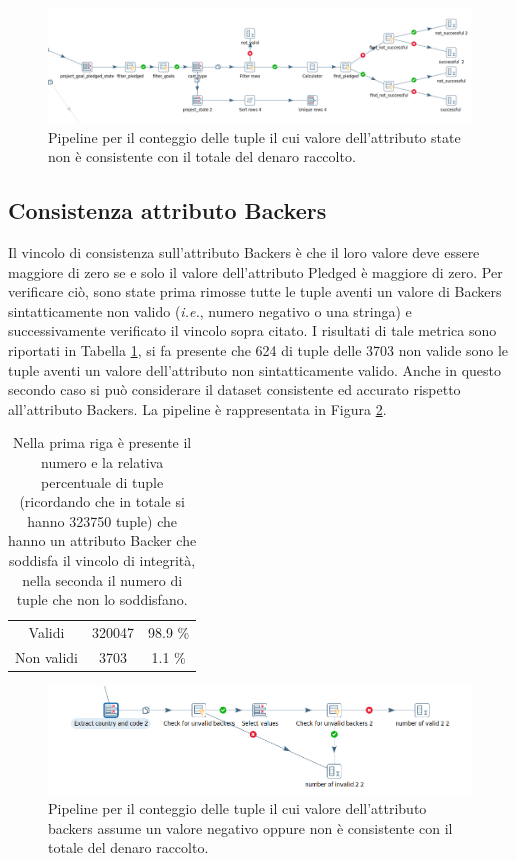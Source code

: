 \begin{figure}[h!]
	\centering
	\includegraphics[width=0.7\linewidth]{images/DQ_stateaconsistency}
	\caption{Pipeline per il conteggio delle tuple il cui valore dell'attributo state non è consistente con il totale del denaro raccolto.}
	\label{fig:dqstateaconsistency}
\end{figure}


\subsection{Consistenza attributo Backers}
Il vincolo di consistenza sull'attributo Backers è che il loro valore deve essere maggiore di zero se e solo il valore dell'attributo Pledged è maggiore di zero.
Per verificare ciò, sono state prima rimosse tutte le tuple aventi un valore di Backers sintatticamente non valido (\textit{i.e.}, numero negativo o una stringa) e successivamente verificato il vincolo sopra citato.
I risultati di tale metrica sono riportati in Tabella \ref{tab:con_backers}, si fa presente che 624 di tuple delle 3703 non valide sono le tuple aventi un valore dell'attributo non sintatticamente valido.
Anche in questo secondo caso si può considerare il dataset consistente ed accurato rispetto all'attributo Backers.
La pipeline è rappresentata in Figura \ref{fig:dqbackersconsistency}.

\begin{table}
	\caption{Nella prima riga è presente il numero e la relativa percentuale di tuple (ricordando che in totale si hanno 323750 tuple) che hanno un attributo Backer che soddisfa il vincolo di integrità, nella seconda il numero di tuple che non lo soddisfano.}
	
	\label{tab:con_backers}
	
	\centering
	\begin{tabular}{c|cc}
		Validi & 320047 & 98.9 \% \\ 
		Non validi & 3703 & 1.1 \% \\
	\end{tabular}
\end{table} 

\begin{figure}[h!]
	\centering
	\includegraphics[width=0.7\linewidth]{images/DQ_backersconsistency}
	\caption{Pipeline per il conteggio delle tuple il cui valore dell'attributo backers assume un valore negativo oppure non è consistente con il totale del denaro raccolto.}
	\label{fig:dqbackersconsistency}
\end{figure}


